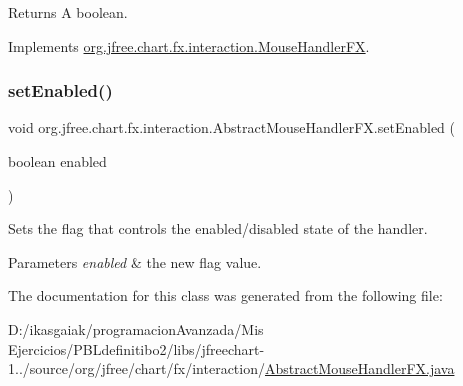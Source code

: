 \begin{DoxyReturn}{Returns}
A boolean. 
\end{DoxyReturn}


Implements \mbox{\hyperlink{interfaceorg_1_1jfree_1_1chart_1_1fx_1_1interaction_1_1_mouse_handler_f_x_a2485249ae77b26b0c7d2099257f0eb80}{org.\+jfree.\+chart.\+fx.\+interaction.\+Mouse\+Handler\+FX}}.

\mbox{\label{classorg_1_1jfree_1_1chart_1_1fx_1_1interaction_1_1_abstract_mouse_handler_f_x_ab6470d66d80656f13b722269a736f752}} 
\subsubsection{\texorpdfstring{set\+Enabled()}{setEnabled()}}
{\footnotesize\ttfamily void org.\+jfree.\+chart.\+fx.\+interaction.\+Abstract\+Mouse\+Handler\+F\+X.\+set\+Enabled (\begin{DoxyParamCaption}\item[{boolean}]{enabled }\end{DoxyParamCaption})}

Sets the flag that controls the enabled/disabled state of the handler.


\begin{DoxyParams}{Parameters}
{\em enabled} & the new flag value. \\
\hline
\end{DoxyParams}


The documentation for this class was generated from the following file\+:\begin{DoxyCompactItemize}
\item 
D\+:/ikasgaiak/programacion\+Avanzada/\+Mis Ejercicios/\+P\+B\+Ldefinitibo2/libs/jfreechart-\/1../source/org/jfree/chart/fx/interaction/\mbox{\hyperlink{_abstract_mouse_handler_f_x_8java}{Abstract\+Mouse\+Handler\+F\+X.\+java}}\end{DoxyCompactItemize}
